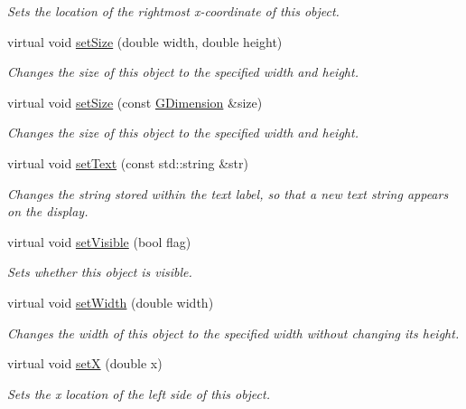 \begin{DoxyCompactItemize}
\begin{DoxyCompactList}\small\item\em Sets the location of the rightmost x-\/coordinate of this object. \end{DoxyCompactList}\item 
virtual void \mbox{\hyperlink{classGObject_aca25d49481f9bf5fc8f7df4c086c4ce7}{set\+Size}} (double width, double height)
\begin{DoxyCompactList}\small\item\em Changes the size of this object to the specified width and height. \end{DoxyCompactList}\item 
virtual void \mbox{\hyperlink{classGObject_ae2b628228f192c2702c4ce941b2af68f}{set\+Size}} (const \mbox{\hyperlink{classGDimension}{G\+Dimension}} \&size)
\begin{DoxyCompactList}\small\item\em Changes the size of this object to the specified width and height. \end{DoxyCompactList}\item 
virtual void \mbox{\hyperlink{classGText_ac98cbe102af8aaf8fd017228d645bfda}{set\+Text}} (const std\+::string \&str)
\begin{DoxyCompactList}\small\item\em Changes the string stored within the text label, so that a new text string appears on the display. \end{DoxyCompactList}\item 
virtual void \mbox{\hyperlink{classGObject_a88203f28224315d9f4471212f4af8ed3}{set\+Visible}} (bool flag)
\begin{DoxyCompactList}\small\item\em Sets whether this object is visible. \end{DoxyCompactList}\item 
virtual void \mbox{\hyperlink{classGObject_aa3f3fba4cb131baa8696ba01e3bceca1}{set\+Width}} (double width)
\begin{DoxyCompactList}\small\item\em Changes the width of this object to the specified width without changing its height. \end{DoxyCompactList}\item 
virtual void \mbox{\hyperlink{classGObject_a9c18fcc579333bf9653d13ad2b372e39}{setX}} (double x)
\begin{DoxyCompactList}\small\item\em Sets the x location of the left side of this object. \end{DoxyCompactList}\item 

\end{DoxyCompactItemize}

